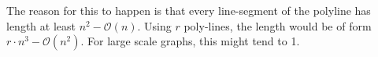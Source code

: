 \bigskip
The reason for this to happen is that every line-segment of the polyline has length at least $n^2 - \mathcal{O}(n)$. Using $r$ poly-lines, the length would be of form $r\cdot n^3 - \mathcal{O}(n^2)$. For large scale graphs, this might tend to 1. 


